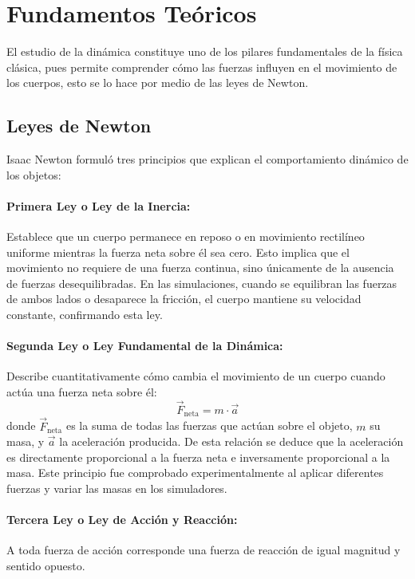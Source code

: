 \documentclass[11pt,a4paper]{article}
\begin{document}
\section{Fundamentos Teóricos}
El estudio de la dinámica constituye uno de los pilares fundamentales de la física clásica, pues permite comprender cómo las fuerzas influyen en el movimiento de los cuerpos, esto se lo hace por medio de las leyes de Newton.

\subsection{Leyes de Newton}
Isaac Newton formuló tres principios que explican el comportamiento dinámico de los objetos:

\paragraph{Primera Ley o Ley de la Inercia:} Establece que un cuerpo permanece en reposo o en movimiento rectilíneo uniforme mientras la fuerza neta sobre él sea cero. Esto implica que el movimiento no requiere de una fuerza continua, sino únicamente de la ausencia de fuerzas desequilibradas. En las simulaciones, cuando se equilibran las fuerzas de ambos lados o desaparece la fricción, el cuerpo mantiene su velocidad constante, confirmando esta ley.

\paragraph{Segunda Ley o Ley Fundamental de la Dinámica:} Describe cuantitativamente cómo cambia el movimiento de un cuerpo cuando actúa una fuerza neta sobre él:
\begin{equation}
    \vec{F}_{\text{neta}} = m \cdot \vec{a}
\end{equation}
donde $\vec{F}_{\text{neta}}$ es la suma de todas las fuerzas que actúan sobre el objeto, $m$ su masa, y $\vec{a}$ la aceleración producida. De esta relación se deduce que la aceleración es directamente proporcional a la fuerza neta e inversamente proporcional a la masa. Este principio fue comprobado experimentalmente al aplicar diferentes fuerzas y variar las masas en los simuladores.

\paragraph{Tercera Ley o Ley de Acción y Reacción:} A toda fuerza de acción corresponde una fuerza de reacción de igual magnitud y sentido opuesto.
\end{document}
